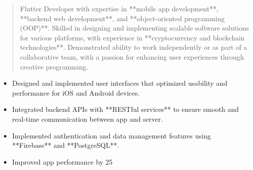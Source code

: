 



\makecvheader

\begin{quote}
  \noindent
  Flutter Developer with expertise in **mobile app development**, **backend web development**, and **object-oriented programming (OOP)**. Skilled in designing and implementing scalable software solutions for various platforms, with experience in **cryptocurrency and blockchain technologies**. Demonstrated ability to work independently or as part of a collaborative team, with a passion for enhancing user experiences through creative programming.
\end{quote}

\par\smallskip
\noindent
\begin{minipage}{20cm}
  \begin{minipage}{9.75cm}
    \begin{itemize}
      \item Designed and implemented user interfaces that optimized usability and performance for iOS and Android devices.
      \item Integrated backend APIs with **RESTful services** to ensure smooth and real-time communication between app and server.
    \end{itemize}
  \end{minipage}
  \hfill
  \begin{minipage}{9.75cm}
    \begin{itemize}
      \item Implemented authentication and data management features using **Firebase** and **PostgreSQL**.
      \item Improved app performance by 25%
    \end{itemize}
  \end{minipage}
\end{minipage}
\par\smallskip
\divider

